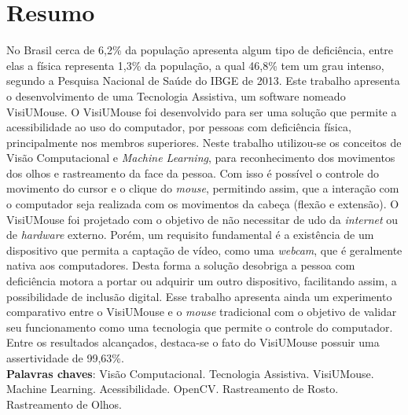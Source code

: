 \chapter*{Resumo}

{\fontsize{12pt}{\baselineskip} \selectfont \noindent {}
No Brasil cerca de 6,2\% da população apresenta algum tipo de deficiência, entre elas a física representa 1,3\% da população, a qual 46,8\% tem um grau intenso, segundo a {Pesquisa  Nacional de Saúde do IBGE de 2013}. Este trabalho apresenta o desenvolvimento de uma Tecnologia Assistiva, um software nomeado VisiUMouse. O VisiUMouse foi desenvolvido para ser uma solução que permite a acessibilidade ao uso do computador, por pessoas com deficiência física, principalmente nos membros superiores. Neste trabalho utilizou-se os conceitos de Visão Computacional e \textit{Machine Learning}, para reconhecimento dos movimentos dos olhos e rastreamento da face da pessoa. Com isso é possível o controle do movimento do cursor e o clique do \textit{mouse}, permitindo assim, que a interação com o computador seja realizada com os movimentos da cabeça (flexão e extensão). O VisiUMouse foi projetado com o objetivo de não necessitar de udo da \textit{internet} ou de \textit{hardware} externo. Porém, um requisito fundamental é a existência de um dispositivo que permita a captação de vídeo, como uma \textit{webcam}, que é geralmente nativa aos computadores. Desta forma a solução desobriga a pessoa com deficiência motora a portar ou adquirir um outro dispositivo, facilitando assim, a possibilidade de inclusão digital. Esse trabalho apresenta ainda um experimento comparativo entre o VisiUMouse e o \textit{mouse} tradicional com o objetivo de validar seu funcionamento como uma tecnologia que permite o controle do computador. Entre os resultados alcançados, destaca-se o fato do VisiUMouse possuir uma assertividade de 99,63\%.
}
\\

\noindent \onehalfspacing {}
\textbf{Palavras chaves}: Visão Computacional. Tecnologia Assistiva. VisiUMouse. Machine Learning. Acessibilidade. OpenCV. Rastreamento de Rosto. Rastreamento de Olhos.


